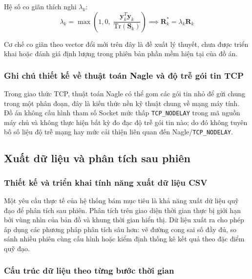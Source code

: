 Hệ số co giãn thích nghi $\lambda_k$:
\begin{equation}
\lambda_k = \max\left(1{,}0, \; \frac{\mathbf{y}_k^T \mathbf{y}_k}{\text{Tr}(\mathbf{S}_k)}\right) \implies \mathbf{R}_k^* = \lambda_k \mathbf{R}_k
\label{eq:adaptive-r-scaling-formula}
\end{equation}

Cơ chế co giãn theo vector đổi mới trên đây là đề xuất lý thuyết, chưa được triển khai hoặc đánh giá định lượng trong phiên bản phần mềm hiện tại của đồ án.

\subsubsection{Ghi chú thiết kế về thuật toán Nagle và độ trễ gói tin TCP}

\hspace{0.5cm} Trong giao thức TCP, thuật toán Nagle có thể gom các gói tin nhỏ để gửi chung trong một phân đoạn, đây là kiến thức nền kỹ thuật chung về mạng máy tính. Đồ án không cấu hình tham số Socket mức thấp \texttt{TCP\_NODELAY} trong mã nguồn máy chủ và không thực hiện bất kỳ đo đạc độ trễ gói tin nào; do đó không tuyên bố số liệu độ trễ mạng hay mức cải thiện liên quan đến Nagle/\texttt{TCP\_NODELAY}.

\subsection{Xuất dữ liệu và phân tích sau phiên}

\subsubsection{Thiết kế và triển khai tính năng xuất dữ liệu CSV}

\hspace{0.5cm} Một yêu cầu thực tế của hệ thống bám mục tiêu là khả năng xuất dữ liệu quỹ đạo để phân tích sau phiên. Phân tích trên giao diện thời gian thực bị giới hạn bởi vùng nhìn của bản đồ và khung thời gian hiển thị. Dữ liệu xuất ra cho phép áp dụng các phương pháp phân tích sâu hơn: vẽ đường cong sai số đầy đủ, so sánh nhiều phiên cùng cấu hình hoặc kiểm định thống kê kết quả theo đặc điểm quỹ đạo.

\subsubsection{Cấu trúc dữ liệu theo từng bước thời gian}

